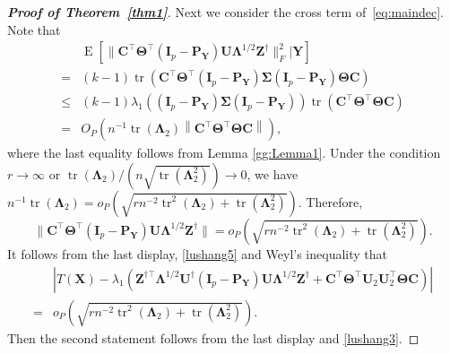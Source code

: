 \documentclass[10pt]{book}
\theoremstyle{definition}
\DeclareMathOperator{\mytr}{tr}
\DeclareMathOperator{\myE}{E}
\newcommand{\bZ}{\mathbf{Z}}
\newcommand{\bX}{\mathbf{X}}
\newcommand{\bP}{\mathbf{P}}
\newcommand{\bY}{\mathbf{Y}}
\newcommand{\bC}{\mathbf{C}}
\newcommand{\bI}{\mathbf{I}}
\newcommand{\bU}{\mathbf{U}}
\newcommand{\bfsym}[1]{\ensuremath{\boldsymbol{#1}}}
\def\bLambda {\bfsym {\Lambda}}
\def\bSigma {\bfsym {\Sigma}}
\def\bTheta {\bfsym {\Theta}}
\begin{document}
\begin{proof}[\textbf{Proof of Theorem~\ref{thm1}}]
Next we consider the cross term of~\eqref{eq:maindec}. Note that
$$
\begin{aligned}
    & \myE [\|\bC^\top \bTheta^\top (\bI_p -\bP_{\bY})\bU\bLambda^{1/2}\bZ^\dagger\|_F^2|\bY]
    \\
    = &
    (k-1)\mytr(\bC^\top \bTheta^\top (\bI_p -\bP_{\bY})\bSigma (\bI_p -\bP_{\bY})\bTheta \bC)\\
    \leq &
    (k-1)
    \lambda_1\left((\bI_p -\bP_{\bY})\bSigma (\bI_p -\bP_{\bY})\right)
    \mytr(\bC^\top \bTheta^\top  \bTheta \bC)\\
    =&
    O_P\left(
    n^{-1}\mytr(\bLambda_2)
    \left\|\bC^\top \bTheta^\top  \bTheta \bC\right\|
\right),
\end{aligned}
$$
where the last equality follows from Lemma \ref{gg:Lemma1}.
Under the condition $r\to \infty$ or $\mytr(\bLambda_2)/(n \sqrt{\mytr(\bLambda_2^2)})\to 0$, we have
$n^{-1}\mytr(\bLambda_2)=o_P\left(\sqrt{
        rn^{-2} \mytr^2 (\bLambda_2) + \mytr(\bLambda_2^2)
}\right)$.
Therefore,
\begin{equation*}
\|\bC^\top \bTheta^\top (\bI_p -\bP_{\bY})\bU\bLambda^{1/2}\bZ^\dagger\|=
o_P\left(
\sqrt{
        rn^{-2} \mytr^2 (\bLambda_2) + \mytr(\bLambda_2^2)
}
\right)
.
\end{equation*}
It follows from the last display, \eqref{lushang5} and Weyl's inequality that
\begin{equation*}
    \begin{split}
    &\left|
    T(\bX)
    -
    \lambda_1\left(
        \bZ^{\dagger\top} \bLambda^{1/2} \bU^\dagger (\bI_p-\bP_\bY) \bU \bLambda^{1/2} \bZ^\dagger 
        +
        \bC^\top \bTheta^\top \bU_2 \bU_2^\top \bTheta \bC
    \right)
    \right|
    \\
    =&
o_P\left(
\sqrt{
        rn^{-2} \mytr^2 (\bLambda_2) + \mytr(\bLambda_2^2)
}
\right).
    \end{split}
\end{equation*}
Then the second statement follows from the last display and \eqref{lushang3}.

\end{proof}
\end{document}
